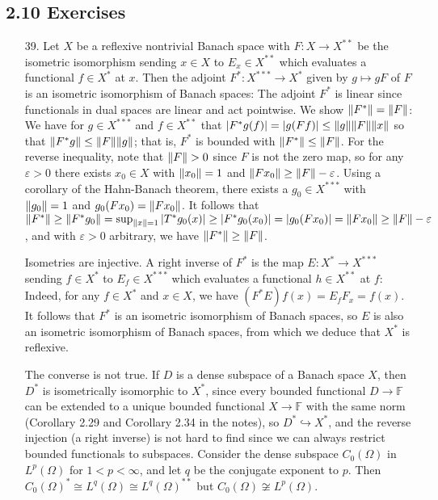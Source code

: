 \documentclass[11pt,leqno]{article}
\theoremstyle{plain}
\theoremstyle{definition}
\numberwithin{equation}{section}
\numberwithin{lem}{section}
\begin{document}
\subsection*{2.10 Exercises}
\begin{enumerate}
  \item[39.] Let $X$ be a reflexive nontrivial Banach space with $F\colon X\to X^{\ast\ast}$ be the isometric isomorphism sending $x\in X$ to $E_x\in X^{\ast\ast}$ which evaluates a functional $f\in X^\ast$ at $x$. Then the adjoint $F^\ast\colon X^{\ast\ast\ast}\to X^\ast$ given by $g\mapsto gF$ of $F$ is an isometric isomorphism of Banach spaces: The adjoint $F^\ast$ is linear since functionals in dual spaces are linear and act pointwise. We show $\norm{F^\ast} = \norm{F}$: We have for $g\in X^{\ast\ast\ast}$ and $f\in X^{\ast\ast}$ that $\abs{F^\ast g(f)} = \abs{g(Ff)} \leq \norm{g}\norm{F}\norm{x}$ so that $\norm{F^\ast g}\leq \norm{F}\norm{g}$; that is, $F^\ast$ is bounded with $\norm{F^\ast}\leq \norm{F}$. For the reverse inequality, note that $\norm{F}>0$ since $F$ is not the zero map, so for any $\varepsilon>0$ there exists $x_0\in X$ with $\norm{x_0} = 1$ and $\norm{Fx_0}\geq \norm{F} - \varepsilon$. Using a corollary of the Hahn-Banach theorem, there exists a $g_0\in X^{\ast\ast\ast}$ with $\norm{g_0} = 1$ and $g_0(Fx_0) = \norm{Fx_0}$. It follows that $\norm{F^\ast}\geq \norm{F^\ast g_0} = \sup_{\norm{x} =1}\abs{T^\ast g_0(x)}\geq \abs{F^\ast g_0(x_0)} = \abs{g_0(Fx_0)} = \norm{Fx_0}\geq \norm{F} - \varepsilon$, and with $\varepsilon>0$ arbitrary, we have $\norm{F^\ast}\geq \norm{F}$.
  
  Isometries are injective. A right inverse of $F^\ast$ is the map $E\colon X^\ast\to X^{\ast\ast\ast}$ sending $f\in X^\ast$ to $E_f\in X^{\ast\ast\ast}$ which evaluates a functional $h\in X^{\ast\ast}$ at $f$: Indeed, for any $f\in X^\ast$ and $x\in X$, we have $(F^\ast E)f(x) = E_fF_x = f(x)$. It follows that $F^\ast$ is an isometric isomorphism of Banach spaces, so $E$ is also an isometric isomorphism of Banach spaces, from which we deduce that $X^\ast$ is reflexive.

  The converse is not true. If $D$ is a dense subspace of a Banach space $X$, then $D^\ast $ is isometrically isomorphic to $ X^\ast$, since every bounded functional $D\to \mathbb F$ can be extended to a unique bounded functional $X\to \mathbb F$ with the same norm (Corollary 2.29 and Corollary 2.34 in the notes), so $D^\ast\hookrightarrow X^\ast$, and the reverse injection (a right inverse) is not hard to find since we can always restrict bounded functionals to subspaces.
  Consider the dense subspace $C_0(\Omega)$ in $L^p(\Omega)$ for $1<p<\infty$, and let $q$ be the conjugate exponent to $p$. Then $C_0(\Omega)^\ast\cong L^q(\Omega)\cong L^q(\Omega)^{\ast\ast}$ but $C_0(\Omega)\not\cong L^p(\Omega)$.
  

\end{enumerate}
\end{document}
